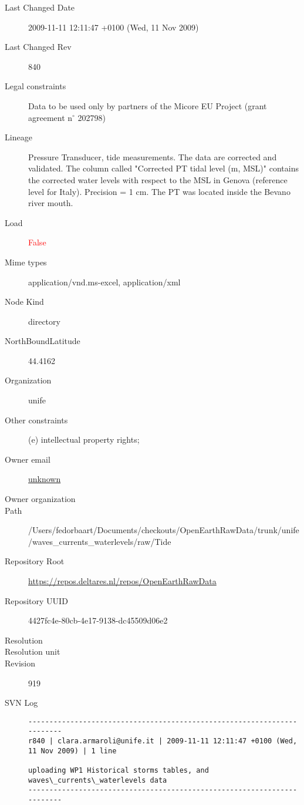 \documentclass[9]{report}
\begin{document}
\begin{description}
  \item[Last Changed Date] 2009-11-11 12:11:47 +0100 (Wed, 11 Nov 2009)
  \item[Last Changed Rev] 840
  \item[Legal constraints] Data to be used only by partners of the Micore EU Project (grant agreement n\mbox{$^\circ$} 202798)
  \item[Lineage] Pressure Transducer, tide measurements. The data are corrected and validated. The column called "Corrected PT tidal level (m, MSL)" contains the corrected water levels with respect to the MSL in Genova (reference level for Italy). Precision = 1 cm. The PT was located inside the Bevano river mouth.
  \item[Load] \textcolor{red}{False}
  \item[Mime types] application/vnd.ms-excel, application/xml
  \item[Node Kind] directory
  \item[NorthBoundLatitude] 44.4162
  \item[Organization] unife
  \item[Other constraints] (e) intellectual property rights;
  \item[Owner email] \href{mailto:unknown}{unknown}
  \item[Owner organization] 
  \item[Path] /Users/fedorbaart/Documents/checkouts/OpenEarthRawData/trunk/unife/waves\_currents\_waterlevels/raw/Tide
  \item[Repository Root] \href{https://repos.deltares.nl/repos/OpenEarthRawData}{https://repos.deltares.nl/repos/OpenEarthRawData}
  \item[Repository UUID] 4427fc4e-80cb-4e17-9138-dc45509d06e2
  \item[Resolution] 
  \item[Resolution unit] 
  \item[Revision] 919
  \item[SVN Log] \begin{verbatim}
------------------------------------------------------------------------
r840 | clara.armaroli@unife.it | 2009-11-11 12:11:47 +0100 (Wed, 11 Nov 2009) | 1 line

uploading WP1 Historical storms tables, and waves\_currents\_waterlevels data
------------------------------------------------------------------------


\end{verbatim}
\end{description}
\end{document}
